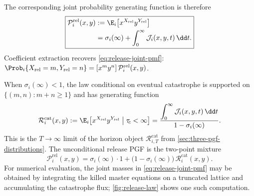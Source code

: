The corresponding joint probability generating function is therefore
\begin{equation}
\boxed{
\begin{aligned}
\mathcal P_i^{\mathrm{rel}}(x,y)
&:=
\E_i\bigl[x^{X_{\mathrm{rel}}}y^{Y_{\mathrm{rel}}}\bigr]
\\
&=
\sigma_i(\infty)
+
\int_0^\infty
\mathcal J_i(x,y,t)\,
\dd t.
\end{aligned}
}
\label{eq:release-pgf}
\end{equation}
Coefficient extraction recovers \cref{eq:release-joint-pmf}: $\Prob_i\{X_{\mathrm{rel}}=m,Y_{\mathrm{rel}}=n\}=[x^my^n]\,\mathcal P_i^{\mathrm{rel}}(x,y)$.

When $\sigma_i(\infty)<1$, the law conditional on eventual catastrophe is supported on $\{(m,n):m+n\ge 1\}$ and has generating function
\begin{equation}
\label{eq:release-conditional}
\mathcal R_i^{\mathrm{cat}}(x,y)
:=
\E_i\bigl[
x^{X_{\mathrm{rel}}}y^{Y_{\mathrm{rel}}}
\bigm|
\tau_{\!c}<\infty
\bigr]
=
\frac{
\displaystyle
\int_0^\infty
\mathcal J_i(x,y,t)\,
\dd t
}{
1-\sigma_i(\infty)
}.
\end{equation}
This is the $T\to\infty$ limit of the horizon object $\mathcal R_{i,T}^{\mathrm{cat}}$ from \cref{sec:three-pgf-distributions}. The unconditional release PGF is the two-point mixture
\begin{equation}
\label{eq:release-mixture}
\mathcal P_i^{\mathrm{rel}}(x,y)
=
\sigma_i(\infty)\cdot 1
+
\bigl(1-\sigma_i(\infty)\bigr)\,
\mathcal R_i^{\mathrm{cat}}(x,y).
\end{equation}
For numerical evaluation, the joint masses in \cref{eq:release-joint-pmf} may be obtained by integrating the killed master equations on a truncated lattice and accumulating the catastrophe flux; \cref{fig:release-law} shows one such computation.

